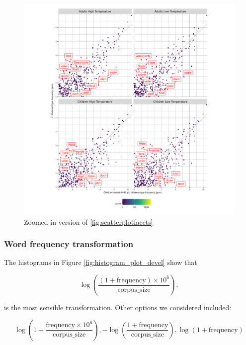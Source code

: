 \documentclass[doc, a4paper]{apa7}
\begin{document}
\begin{figure}[!htbp]
  \centerline{
    \includegraphics[scale=.8]{figures/scatterplotfacetszoom.pdf}}
    \caption{Zoomed in version of \ref{fig:scatterplotfacets}}
    \label{fig:scatterplotfacetszoom}
\end{figure}

\clearpage


\subsubsection{Word frequency transformation}

The histograms in Figure \ref{fig:histogram_plot_devel} show that 

\begin{equation}
\log\left(\frac{(1 + \text{frequency}) \times 10^6}{\text{corpus\_size}}\right),    
\label{eq:theone}
\end{equation}

is the most sensible transformation. Other options we considered included: 

\begin{equation}
\log \left( 1 + \frac{\text{frequency} \times 10^6}{\text{corpus\_size}} \right), 
- \log \left( \frac{1 + \text{frequency}}{\text{corpus\_size}} \right), 
\log \left( 1 + \text{frequency} \right) 
\label{eq:others}
\end{equation}
\end{document}
